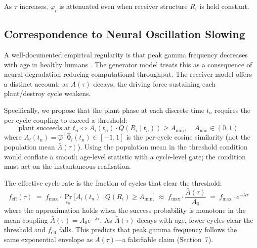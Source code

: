 \documentclass[12pt]{article}
\begin{document}
As $\tau$ increases, $\varphi_i$ is attenuated even when receiver structure $R_i$ is held constant.

\subsection{Correspondence to Neural Oscillation Slowing}

A well-documented empirical regularity is that peak gamma frequency decreases with age in healthy humans \cite{polich2007}. The generator model treats this as a consequence of neural degradation reducing computational throughput. The receiver model offers a distinct account: as $A(\tau)$ decays, the driving force sustaining each plant/destroy cycle weakens.

Specifically, we propose that the plant phase at each discrete time $t_n$ requires the per-cycle coupling to exceed a threshold:
\begin{equation}
    \text{plant succeeds at }t_n \iff A_i(t_n)\cdot Q(R_i(t_n)) \geq A_{\min}, \quad A_{\min}\in(0,1)
\end{equation}
where $A_i(t_n)=\hat{\varphi}^\top\hat{\boldsymbol{\theta}}_i(t_n)\in[-1,1]$ is the per-cycle cosine similarity (not the population mean $\bar{A}(\tau)$). Using the population mean in the threshold condition would conflate a smooth age-level statistic with a cycle-level gate; the condition must act on the instantaneous realisation.

The effective cycle rate is the fraction of cycles that clear the threshold:
\begin{equation}
    f_{\mathrm{eff}}(\tau) \;=\;
    f_{\max}\cdot\Pr_{t_n}\!\bigl[A_i(t_n)\cdot Q(R_i)\geq A_{\min}\bigr]
    \;\approx\; f_{\max}\cdot\frac{\bar{A}(\tau)}{A_0}
    \;=\; f_{\max}\cdot e^{-\lambda\tau}
\end{equation}
where the approximation holds when the success probability is monotone in the mean coupling $\bar{A}(\tau)=A_0 e^{-\lambda\tau}$. As $\bar{A}(\tau)$ decays with age, fewer cycles clear the threshold and $f_{\mathrm{eff}}$ falls. This predicts that peak gamma frequency follows the same exponential envelope as $\bar{A}(\tau)$---a falsifiable claim (Section~7).
\end{document}
